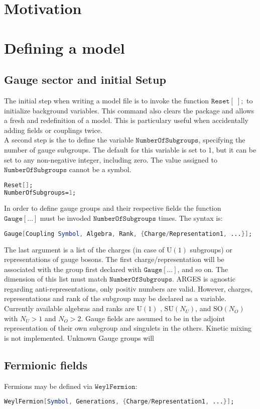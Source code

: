 \documentclass{scrartcl}
\begin{document}
\tableofcontents
\thispagestyle{empty}
\newpage
\section{Motivation}
\newpage
\section{Defining a model}
\subsection{Gauge sector and initial Setup}
The initial step when writing a model file is to invoke the function $\mathtt{Reset[\;];}$ to initialize background variables. This command also clears the package and allows a fresh and redefinition of a model. This is particulary useful when accidentally adding fields or couplings twice. \\
A second step is the to define the variable $\mathtt{NumberOfSubgroups}$, specifying the number of gauge subgroups. The default for this variable is set to 1, but it can be set to any non-negative integer, including zero. The value assigned to $\mathtt{NumberOfSubgroups}$ cannot be a symbol.
\vspace{1em}
\begin{lstlisting}[language=mathematica,mathescape,columns=flexible,backgroundcolor=\color{light-gray}]
Reset[];
NumberOfSubgroups=1;
\end{lstlisting}
\vspace{1em}
In order to define gauge groups and their respective fields the function $\mathtt{Gauge[\dots]}$ must be invoded $\mathtt{NumberOfSubgroups}$ times. The syntax is:
\begin{lstlisting}[language=mathematica,mathescape,columns=flexible,backgroundcolor=\color{light-gray}]
Gauge[Coupling Symbol, Algebra, Rank, {Charge/Representation1, ...}];
\end{lstlisting}
The last argument is a list of the charges (in case of $\mathrm{U}(1)$ subgroups) or representations of gauge bosons. The first charge/representation will be associated with the group first declared with $\mathtt{Gauge[\dots]}$, and so on. The dimension of this list must match $\mathtt{NumberOfSubgroups}$. ARGES is agnostic regarding anti-representations, only positiv numbers are valid. However, charges, representations and rank of the subgroup may be declared as a variable. \newline Currently available algebras and ranks are $\mathrm{U}(1)$ , $\mathrm{SU}(N_U)$, and $\mathrm{SO}(N_O)$ with $N_U > 1$ and $N_O > 2$. Gauge fields are assumed to be in the adjoint representation of their own subgroup and singulets in the others. Kinetic mixing is not implemented. \newline Unknown Gauge groups will 
\subsection{Fermionic fields}
Fermions may be defined via $\mathtt{WeylFermion}$:
\begin{lstlisting}[language=mathematica,mathescape,columns=flexible,backgroundcolor=\color{light-gray}]
WeylFermion[Symbol, Generations, {Charge/Representation1, ...}];
\end{lstlisting}

\end{document}
